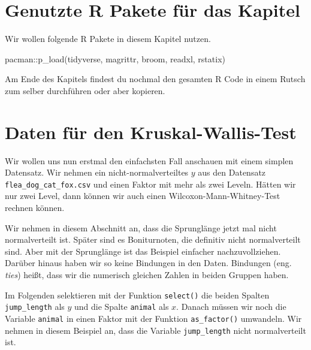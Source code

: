 \documentclass[
  letterpaper,
  DIV=11,
  oneside]{scrreport}
\newenvironment{Shaded}{\begin{snugshade}}{\end{snugshade}}
\newcommand{\FunctionTok}[1]{\textcolor[rgb]{0.28,0.35,0.67}{#1}}
\newcommand{\NormalTok}[1]{\textcolor[rgb]{0.00,0.23,0.31}{#1}}
\newcommand{\SpecialCharTok}[1]{\textcolor[rgb]{0.37,0.37,0.37}{#1}}
\begin{document}
\hypertarget{genutzte-r-pakete-fuxfcr-das-kapitel-6}{%
\section{Genutzte R Pakete für das
Kapitel}\label{genutzte-r-pakete-fuxfcr-das-kapitel-6}}

Wir wollen folgende R Pakete in diesem Kapitel nutzen.

\begin{Shaded}
\begin{Highlighting}[]
\NormalTok{pacman}\SpecialCharTok{::}\FunctionTok{p\_load}\NormalTok{(tidyverse, magrittr, broom, }
\NormalTok{               readxl, rstatix)}
\end{Highlighting}
\end{Shaded}

Am Ende des Kapitels findest du nochmal den gesamten R Code in einem
Rutsch zum selber durchführen oder aber kopieren.

\hypertarget{daten-fuxfcr-den-kruskal-wallis-test}{%
\section{Daten für den
Kruskal-Wallis-Test}\label{daten-fuxfcr-den-kruskal-wallis-test}}

{}

Wir wollen uns nun erstmal den einfachsten Fall anschauen mit einem
simplen Datensatz. Wir nehmen ein nicht-normalverteiltes \(y\) aus den
Datensatz \texttt{flea\_dog\_cat\_fox.csv} und einen Faktor mit mehr als
zwei Leveln. Hätten wir nur zwei Level, dann können wir auch einen
Wilcoxon-Mann-Whitney-Test rechnen können.

Wir nehmen in diesem Abschnitt an, dass die Sprunglänge jetzt mal nicht
normalverteilt ist. Später sind es Boniturnoten, die definitiv nicht
normalverteilt sind. Aber mit der Sprunglänge ist das Beispiel einfacher
nachzuvollziehen. Darüber hinaus haben wir so keine Bindungen in den
Daten. Bindungen (eng. \emph{ties}) heißt, dass wir die numerisch
gleichen Zahlen in beiden Gruppen haben.

Im Folgenden selektieren mit der Funktion \texttt{select()} die beiden
Spalten \texttt{jump\_length} als \(y\) und die Spalte \texttt{animal}
als \(x\). Danach müssen wir noch die Variable \texttt{animal} in einen
Faktor mit der Funktion \texttt{as\_factor()} umwandeln. Wir nehmen in
diesem Beispiel an, dass die Variable \texttt{jump\_length} nicht
normalverteilt ist.
\end{document}
